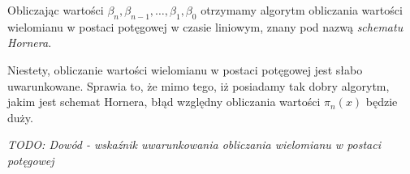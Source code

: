 \documentclass[wide, 11pt]{mwart}
\begin{document}
Obliczając wartości $\beta_n, \beta_{n-1}, \ldots, \beta_1, \beta_0$ otrzymamy
algorytm obliczania wartości wielomianu w postaci potęgowej w czasie liniowym,
znany pod nazwą \emph{schematu Hornera}.

Niestety, obliczanie wartości wielomianu w postaci potęgowej jest 
słabo uwarunkowane. Sprawia to, że mimo tego, iż posiadamy tak dobry algorytm,
jakim jest schemat Hornera, błąd względny obliczania wartości $\pi_n(x)$ będzie 
duży.

\emph{TODO: Dowód - wskaźnik uwarunkowania obliczania wielomianu w 
postaci potęgowej}
\end{document}
